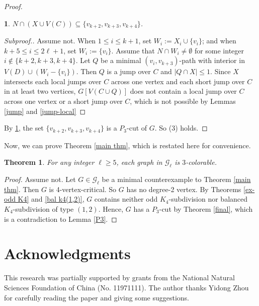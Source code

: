 \documentclass[11pt]{article}
\newtheorem{theorem}{Theorem}[section]
\newtheorem{claim}{}[theorem]
\begin{document}
\begin{proof}
\begin{claim}\label{N}
$N\cap(X\cup V(C))\subseteq\{v_{k+2},v_{k+3},v_{k+4}\}$.
\end{claim}
\begin{proof}[Subproof.]
Assume not. When $1\leq i\leq k+1$, set $W_i:=X_i\cup\{v_i\}$; and when $k+5\leq i\leq 2\ell+1$, set $W_i:=\{v_i\}$. Assume that $N\cap W_i\neq\emptyset$ for some integer $i\notin\{{k+2},{k+3}, {k+4}\}$. Let $Q$ be a minimal $(v_i,v_{k+3})$-path with interior in $V(D)\cup(W_i-\{v_i\})$. Then $Q$ is a jump over $C$ and $|Q\cap X|\leq1$. Since $X$ intersects each local jumps over $C$ across one vertex and each short jump over $C$ in at least two vertices, $G[V(C\cup Q)]$ does not contain a local jump over $C$ across one vertex or a short jump over $C$, which is not possible by Lemmas \ref{jump} and \ref{jump-local}
\end{proof}

By \ref{N}, the set $\{v_{k+2},v_{k+3},v_{k+4}\}$ is a $P_3$-cut of $G$. So (3) holds. %
\end{proof}

Now, we can prove Theorem \ref{main thm}, which is restated here for convenience.

\begin{theorem}\label{}
For any integer $\ell\geq5$, each graph in $\mathcal{G}_{\ell}$ is $3$-colorable.
\end{theorem}

\begin{proof}%
Assume not. Let $G\in \mathcal{G}_{\ell}$ be a minimal counterexample to Theorem \ref{main thm}. Then $G$ is 4-vertex-critical. So $G$ has no degree-2 vertex. By Theorems \ref{ex-odd K4} and \ref{bal k4(1,2)},
$G$ contains neither odd $K_4$-subdivision nor balanced $K_4$-subdivision of type $(1,2)$. Hence, $G$ has a $P_3$-cut by Theorem \ref{final}, which is a contradiction to Lemma \ref{P3}.
\end{proof}

\section{Acknowledgments}
This research was partially supported by grants from the National Natural Sciences
Foundation of China (No. 11971111). 
The author thanks Yidong Zhou for carefully reading the paper and giving some suggestions.
\end{document}
